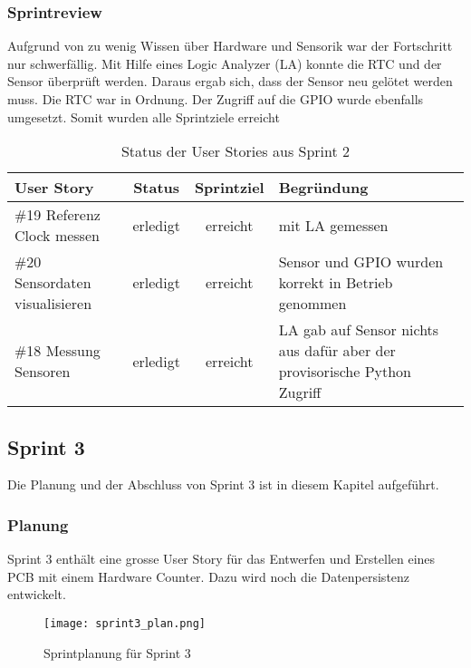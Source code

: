 \subsubsection*{Sprintreview}
Aufgrund von zu wenig Wissen über Hardware und Sensorik war der Fortschritt nur schwerfällig. Mit Hilfe eines Logic Analyzer (LA) konnte die RTC und der Sensor überprüft werden. Daraus ergab sich, dass der Sensor neu gelötet werden muss. Die RTC war in Ordnung. Der Zugriff auf die GPIO wurde ebenfalls umgesetzt. Somit wurden alle Sprintziele erreicht
\begin{table}[H]
    \centering
    \begin{tabular}{lccp{7cm}}
        \textbf{User Story} &  \textbf{Status} & \textbf{Sprintziel}& \textbf{Begründung}\\\toprule[2pt]
        \#19 Referenz Clock messen & erledigt & erreicht & mit LA gemessen\\
        \#20 Sensordaten visualisieren & erledigt & erreicht & Sensor und GPIO wurden korrekt in Betrieb genommen\\
        \#18 Messung Sensoren & erledigt & erreicht & LA gab auf Sensor nichts aus dafür aber der provisorische Python Zugriff\\
    \end{tabular}
    \caption{Status der User Stories aus Sprint 2}
\end{table}

\clearpage
\subsection*{Sprint 3}
Die Planung und der Abschluss von Sprint 3 ist in diesem Kapitel aufgeführt.
\subsubsection*{Planung}
Sprint 3 enthält eine grosse User Story für das Entwerfen und Erstellen eines PCB mit einem Hardware Counter. Dazu wird noch die Datenpersistenz entwickelt.
\begin{figure}[H]
    \centering
    \texttt{[image: sprint3\_plan.png]}
    \caption{Sprintplanung für Sprint 3}
\end{figure}
